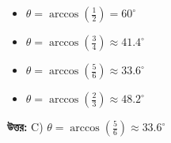 \documentclass[12pt, a4paper]{article}
\begin{document}
\begin{itemize}[label={}, leftmargin=1cm, itemsep=0.5em]
    \item[\textbf{A)}]  $\theta = \arccos\left(\frac{1}{2}\right) = 60^\circ$
    \item[\textbf{B)}]$\theta = \arccos\left(\frac{3}{4}\right) \approx 41.4^\circ$
    \item[\textbf{C)}]  $\theta = \arccos\left(\frac{5}{6}\right) \approx 33.6^\circ$
    \item[\textbf{D)}]  $\theta = \arccos\left(\frac{2}{3}\right) \approx 48.2^\circ$
\end{itemize}

\vspace{0.5em}
\begin{tcolorbox}[answerbox]
    \textbf{\color{success} উত্তর:} C)  $\theta = \arccos\left(\frac{5}{6}\right) \approx 33.6^\circ$
\end{tcolorbox}
\vspace{1em}
\end{document}
